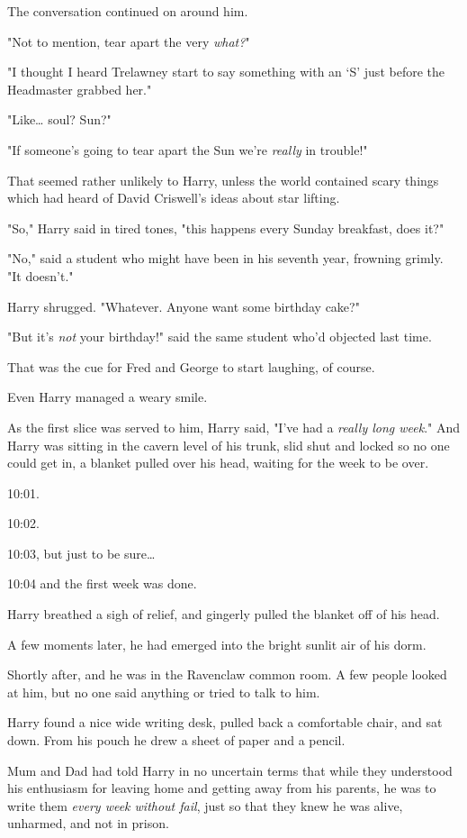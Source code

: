 The conversation continued on around him.

"Not to mention, tear apart the very \emph{what?}"

"I thought I heard Trelawney start to say something with an `S' just before the
Headmaster grabbed her."

"Like{\ldots} soul? Sun?"

"If someone's going to tear apart the Sun we're \emph{really} in trouble!"

That seemed rather unlikely to Harry, unless the world contained scary things
which had heard of David Criswell's ideas about star lifting.

"So," Harry said in tired tones, "this happens every Sunday breakfast, does it?"

"No," said a student who might have been in his seventh year, frowning grimly.
"It doesn't."

Harry shrugged. "Whatever. Anyone want some birthday cake?"

"But it's \emph{not} your birthday!" said the same student who'd objected last
time.

That was the cue for Fred and George to start laughing, of course.

Even Harry managed a weary smile.

As the first slice was served to him, Harry said, "I've had a \emph{really long
week}."
\sbreak
And Harry was sitting in the cavern level of his trunk, slid shut and locked so
no one could get in, a blanket pulled over his head, waiting for the week to be
over.

10:01.

10:02.

10:03, but just to be sure{\ldots}

10:04 and the first week was done.

Harry breathed a sigh of relief, and gingerly pulled the blanket off of his
head.

A few moments later, he had emerged into the bright sunlit air of his dorm.

Shortly after, and he was in the Ravenclaw common room. A few people looked at
him, but no one said anything or tried to talk to him.

Harry found a nice wide writing desk, pulled back a comfortable chair, and sat
down. From his pouch he drew a sheet of paper and a pencil.

Mum and Dad had told Harry in no uncertain terms that while they understood his
enthusiasm for leaving home and getting away from his parents, he was to write
them \emph{every week without fail}, just so that they knew he was alive,
unharmed, and not in prison.

